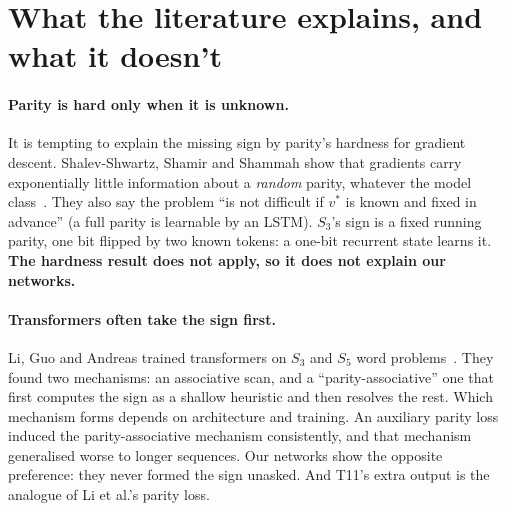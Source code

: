\documentclass[11pt]{article}
\begin{document}
\section{What the literature explains, and what it doesn't}

\paragraph{Parity is hard only when it is unknown.} It is tempting to explain the missing sign by
parity's hardness for gradient descent. Shalev-Shwartz, Shamir and Shammah show that gradients
carry exponentially little information about a \emph{random} parity, whatever the model
class~\citep[Section~2]{shalev-shwartz-2017-failures-gradient-based-deep-learning}. They also say the
problem ``is not difficult if $v^*$ is known and fixed in advance'' (a full parity is learnable by an
LSTM). $S_3$'s sign is a fixed running parity, one bit flipped by two known tokens: a one-bit
recurrent state learns it. \textbf{The hardness result does not apply, so it does not explain our
networks.}

\paragraph{Transformers often take the sign first.} Li, Guo and Andreas trained transformers on
$S_3$ and $S_5$ word problems~\citep{li-2025-how-language-models-track-state}. They found two
mechanisms: an associative scan, and a ``parity-associative'' one that first computes the sign as a
shallow heuristic and then resolves the rest. Which mechanism forms depends on architecture and
training. An auxiliary parity loss induced the parity-associative mechanism consistently, and that
mechanism generalised worse to longer sequences. Our networks show the opposite preference: they
never formed the sign unasked. And T11's extra output is the analogue of Li et al.'s parity loss.
\end{document}
